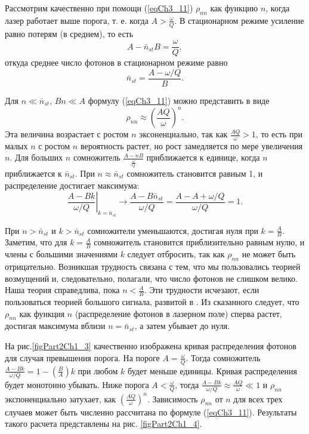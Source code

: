 Рассмотрим качественно при помощи (\ref{eqCh3_11}) $\rho_{nn}$ как
функцию $n$, когда лазер работает выше порога, т. е. когда $A >
\frac{\omega}{Q}$. В стационарном режиме усиление равно потерям (в среднем), то есть 
\[
A - \bar{n}_{st}B = \frac{\omega}{Q},
\]
откуда среднее число фотонов в стационарном режиме равно
\[
\bar{n}_{st} = \frac{A - \omega/Q}{B}.
\] 

Для $n \ll \bar{n}_{st}$, $B n \ll A$ формулу (\ref{eqCh3_11}) можно
представить в виде 
\[
\rho_{nn} \approx \left(\frac{A Q}{\omega}\right)^n.
\]
Эта величина возрастает с ростом $n$ эксоненциально, так как $\frac{A Q}{\omega} >
1$, то есть при малых $n$ с ростом $n$ вероятность растет, но рост 
замедляется по мере увеличения $n$.  Для больших $n$ сомножитель
$\frac{A - nB}{\frac{\omega}{Q}}$
приближается к единице, когда $n$ приближается к $\bar{n}_{st}$. 
При $n \approx \bar{n}_{st}$ сомножитель становится равным  1,  и
распределение достигает максимума: 
\[
\left.\frac{A - B k}{\omega/Q}\right|_{k = \bar{n}_{st}}
\rightarrow \frac{A - B \bar{n}_{st}}{\omega/Q} = 
\frac{A - A + \omega/Q}{\omega/Q} = 1.
\] 

При $n > \bar{n}_{st}$ и $k > \bar{n}_{st}$ сомножители уменьшаются,
достигая нуля при $k = \frac{A}{B}$. Заметим, 
что для $k = \frac{A}{B}$ сомножитель становится приблизительно равным
нулю, и члены с большими значениями $k$ следует отбросить, так как
$\rho_{nn}$ не может быть отрицательно. Возникшая трудность связана с
тем, что мы пользовались теорией возмущений и, следовательно,
полагали, что число фотонов не слишком велико. Наша теория
справедлива, пока $n < \frac{A}{B}$.  Эти трудности 
исчезают, если пользоваться теорией большого сигнала, развитой в
\cite{bScally1974}. Из сказанного следует, что $\rho_{nn}$ как
функция  $n$ (распределение фотонов в лазерном поле) сперва растет,
достигая максимума вблизи $n = \bar{n}_{st}$, а затем убывает до нуля.   



На рис.\ref{figPart2Ch1_3} качественно изображена кривая распределения
фотонов для 
случая превышения порога. На пороге $A = \frac{\omega}{Q}$.  Тогда
сомножитель $\frac{A - B k}{\omega/Q} = 1 - \left(\frac{B}{A}\right)k$
при любом $k$ будет меньше единицы. Кривая распределения будет монотонно
убывать. Ниже порога $A < \frac{\omega}{Q}$, тогда $\frac{A - B
  k}{\omega/Q} \approx \frac{A Q}{\omega} \ll 1$ и $\rho_{nn}$
экспоненциально затухает, как $\left(\frac{A
  Q}{\omega}\right)^n$. Зависимость $\rho_{nn}$ от $n$ для всех трех
случаев может быть численно рассчитана по формуле
(\ref{eqCh3_11}). Результаты такого расчета представлены на
рис. \ref{figPart2Ch1_4}. 

